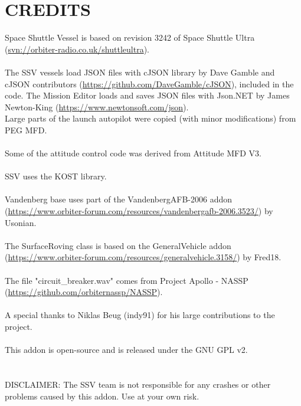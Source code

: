 \documentclass[Space_Shuttle_Vessel_Manual.tex]{subfiles}
\begin{document}
\section{CREDITS}
Space Shuttle Vessel is based on revision 3242 of Space Shuttle Ultra (\url{svn://orbiter-radio.co.uk/shuttleultra}).\\
\\
The SSV vessels load JSON files with cJSON library by Dave Gamble and cJSON contributors (\url{https://github.com/DaveGamble/cJSON}), included in the code. The Mission Editor loads and saves JSON files with Json.NET by James Newton-King (\url{https://www.newtonsoft.com/json}).
\\
Large parts of the launch autopilot were copied (with minor modifications) from PEG MFD.\\
\\
Some of the attitude control code was derived from Attitude MFD V3.\\
\\
SSV uses the KOST library.\\
\\
Vandenberg base uses part of the VandenbergAFB-2006 addon (\url{https://www.orbiter-forum.com/resources/vandenbergafb-2006.3523/}) by Usonian.\\
\\
The SurfaceRoving class is based on the GeneralVehicle addon (\url{https://www.orbiter-forum.com/resources/generalvehicle.3158/}) by Fred18.\\
\\
The file "circuit\_breaker.wav" comes from Project Apollo - NASSP (\url{https://github.com/orbiternassp/NASSP}).\\
\\
A special thanks to Niklas Beug (indy91) for his large contributions to the project.\\
\\
This addon is open-source and is released under the GNU GPL v2.\\
\\
\\
DISCLAIMER: The SSV team is not responsible for any crashes or other problems caused by this addon. Use at your own risk.
\end{document}
